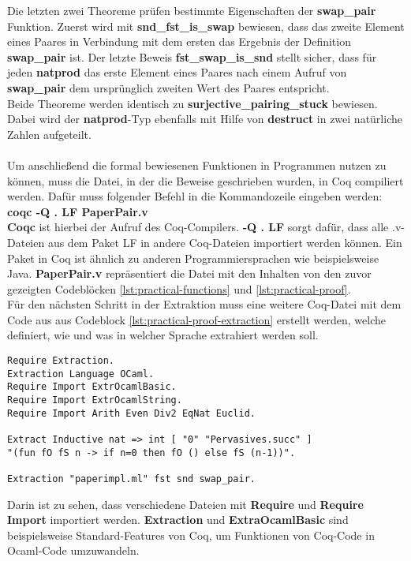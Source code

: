 Die letzten zwei Theoreme prüfen bestimmte Eigenschaften der \textbf{swap\_pair} Funktion. Zuerst wird mit \textbf{snd\_fst\_is\_swap} bewiesen, dass das zweite Element eines Paares in Verbindung mit dem ersten das Ergebnis der Definition \textbf{swap\_pair} ist. Der letzte Beweis \textbf{fst\_swap\_is\_snd} stellt sicher, dass für jeden \textbf{natprod} das erste Element eines Paares nach einem Aufruf von \textbf{swap\_pair} dem ursprünglich zweiten Wert des Paares entspricht.\\
Beide Theoreme werden identisch zu \textbf{surjective\_pairing\_stuck} bewiesen. Dabei wird der \textbf{natprod}-Typ ebenfalls mit Hilfe von \textbf{destruct} in zwei natürliche Zahlen aufgeteilt.\\
\\
Um anschließend die formal bewiesenen Funktionen in Programmen nutzen zu können, muss die Datei, in der die Beweise geschrieben wurden, in Coq compiliert werden. Dafür muss folgender Befehl in die Kommandozeile eingeben werden:\\
\textbf{coqc -Q . LF PaperPair.v} \\
\textbf{Coqc} ist hierbei der Aufruf des Coq-Compilers. \textbf{-Q . LF} sorgt dafür, dass alle .v-Dateien aus dem Paket LF in andere Coq-Dateien importiert werden können. Ein Paket in Coq ist ähnlich zu anderen Programmiersprachen wie beispielsweise Java. \textbf{PaperPair.v} repräsentiert die Datei mit den Inhalten von den zuvor gezeigten Codeblöcken \ref{lst:practical-functions} und \ref{lst:practical-proof}.
\\
Für den nächsten Schritt in der Extraktion muss eine weitere Coq-Datei mit dem Code aus aus Codeblock \ref{lst:practical-proof-extraction} erstellt werden, welche definiert, wie und was in welcher Sprache extrahiert werden soll.
\begin{lstlisting}[language=coq,firstnumber=1,caption=Coq Code extrahieren (PaperPairExtraction.v),label=lst:practical-proof-extraction]
Require Extraction.
Extraction Language OCaml.
Require Import ExtrOcamlBasic.
Require Import ExtrOcamlString.
Require Import Arith Even Div2 EqNat Euclid.

Extract Inductive nat => int [ "0" "Pervasives.succ" ]
"(fun fO fS n -> if n=0 then fO () else fS (n-1))".

Extraction "paperimpl.ml" fst snd swap_pair.
\end{lstlisting}
Darin ist zu sehen, dass verschiedene Dateien mit \textbf{Require} und \textbf{Require Import} importiert werden. \textbf{Extraction} und \textbf{ExtraOcamlBasic} sind beispielsweise Standard-Features von Coq, um Funktionen von Coq-Code in Ocaml-Code umzuwandeln.\\
